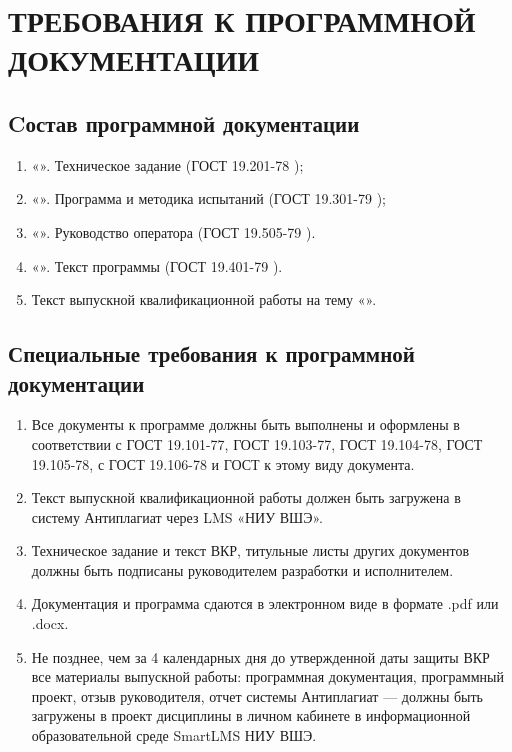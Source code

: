 \section{ТРЕБОВАНИЯ К ПРОГРАММНОЙ ДОКУМЕНТАЦИИ}

\subsection{Cостав программной документации}
\label{docs.list}

\begin{enumerate}
    \item «\docTitle». Техническое задание (ГОСТ 19.201-78 \cite{gost:19.201-78});
    \item «\docTitle». Программа и методика испытаний (ГОСТ 19.301-79 \cite{gost:19.301-79});
    \item «\docTitle». Руководство оператора (ГОСТ 19.505-79  \cite{gost:19.505-79}).
    \item «\docTitle». Текст программы (ГОСТ 19.401-79 \cite{gost:19.401-79}).
    \item Текст выпускной квалификационной работы на тему «\docTitle».
\end{enumerate}

\subsection{Специальные требования к программной документации}
\label{docs.extra}

\begin{enumerate}
    \item Все документы к программе должны быть выполнены и оформлены в соответствии с
    ГОСТ 19.101-77, ГОСТ 19.103-77, ГОСТ 19.104-78, ГОСТ 19.105-78, с ГОСТ 19.106-78 и ГОСТ к этому виду документа.
    \item Текст выпускной квалификационной работы должен быть загружена в систему Антиплагиат через LMS «НИУ ВШЭ».
    \item Техническое задание и текст ВКР, титульные листы других документов должны быть подписаны руководителем разработки и исполнителем.
    \item Документация и программа сдаются в электронном виде в формате .pdf или .docx.
    \item Не позднее, чем за 4 календарных дня до утвержденной даты защиты ВКР все материалы выпускной работы: программная документация, программный проект, отзыв руководителя, отчет системы Антиплагиат — должны быть загружены в проект дисциплины в личном кабинете в информационной образовательной среде SmartLMS НИУ ВШЭ.
\end{enumerate}

\clearpage